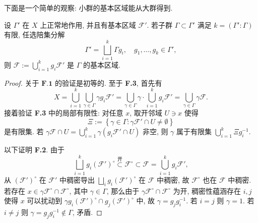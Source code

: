 下面是一个简单的观察: 小群的基本区域能从大群得到.
\begin{proposition}\label{prop:fundamental-domain-sub}
	设 $\Gamma'$ 在 $X$ 上正常地作用, 并且有基本区域 $\mathcal{F}'$. 若子群 $\Gamma \subset \Gamma'$ 满足 $k = (\Gamma':\Gamma)$ 有限, 任选陪集分解
	\[ \Gamma' = \bigsqcup_{i=1}^k \Gamma g_i, \quad g_1, \ldots, g_k \in \Gamma', \]
	则 $\mathcal{F} := \bigcup_{i=1}^k g_i\mathcal{F}'$ 是 $\Gamma$ 的基本区域.
\end{proposition}
\begin{proof}
	关于 $\textbf{F.1}$ 的验证是初等的. 至于 \textbf{F.3}, 首先有
	\[ X = \bigcup_{i=1}^k \bigcup_{\gamma \in \Gamma} \gamma g_i \mathcal{F}' = \bigcup_{\gamma \in \Gamma} \gamma \cdot \bigcup_{i=1}^k g_i \mathcal{F}' = \bigcup_{\gamma \in \Gamma} \gamma \mathcal{F}. \]
	接着验证 \textbf{F.3} 中的局部有限性: 对任意 $x$, 取开邻域 $U \ni x$ 使得
	\[ \Xi := \left\{ \gamma \in \Gamma: \gamma\mathcal{F}' \cap U \neq \emptyset \right\} \]
	是有限集. 若 $\gamma \mathcal{F} \cap U = \bigcup_{i=1}^k \gamma \left( g_i \mathcal{F}' \cap U \right)$ 非空, 则 $\gamma$ 属于有限集 $\bigcup_{i=1}^k \Xi g_i^{-1}$.

	以下证明 \textbf{F.2}. 由于
	\[ \bigsqcup_{i=1}^k g_i(\mathcal{F}')^\circ \stackrel{\text{开}}{\subset} \mathcal{F}^\circ \subset \mathcal{F} = \bigcup_{i=1}^k g_i\mathcal{F}' , \]
	从 $(\mathcal{F}')^\circ$ 在 $\mathcal{F}'$ 中稠密导出 $\bigsqcup_i g_i(\mathcal{F}')^\circ$ 在 $\mathcal{F}$ 中稠密, 故 $\mathcal{F}^\circ$ 也在 $\mathcal{F}$ 中稠密. 若存在 $x \in \gamma \mathcal{F}^\circ \cap \mathcal{F}^\circ$, 其中 $\gamma \in \Gamma$, 那么由于 $\gamma\mathcal{F}^\circ \cap \mathcal{F}^\circ$ 为开, 稠密性蕴涵存在 $i,j$ 使得 $x$ 可以扰动到 $\gamma g_i (\mathcal{F}')^\circ \cap g_j(\mathcal{F}')^\circ$ 中, 故 $\gamma = g_j g_i^{-1}$. 若 $i=j$ 则 $\gamma = 1$. 若 $i \neq j$ 则 $\gamma = g_j g_i^{-1} \notin \Gamma$, 矛盾.
\end{proof}

